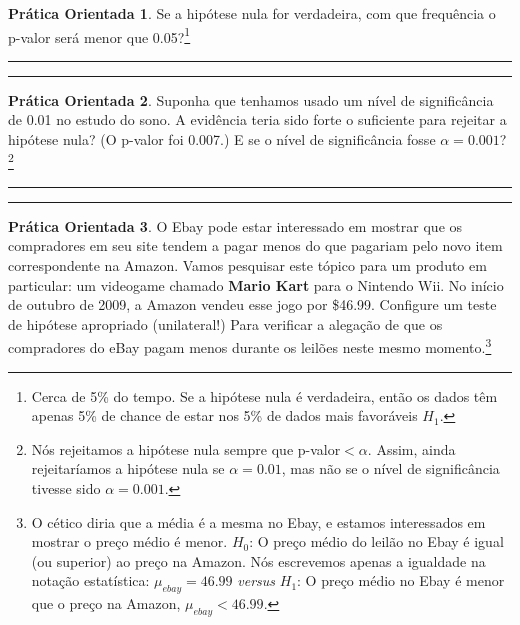 \documentclass[
]{book}
\theoremstyle{definition}
\theoremstyle{definition}
\theoremstyle{definition}
\newtheorem{exercise}{Prática Orientada}[chapter]
\theoremstyle{definition}
\theoremstyle{remark}
\begin{document}
\begin{exercise}
\protect\hypertarget{exr:unnamed-chunk-165}{}{\label{exr:unnamed-chunk-165} }Se a hipótese nula for verdadeira, com que frequência o p-valor será menor que 0.05?\footnote{Cerca de 5\% do tempo. Se a hipótese nula é verdadeira, então os dados têm apenas 5\% de chance de estar nos 5\% de dados mais favoráveis \(H_1\).}
\end{exercise}

\begin{center}\rule{0.5\linewidth}{0.5pt}\end{center}

\begin{center}\rule{0.5\linewidth}{0.5pt}\end{center}

\begin{exercise}
\protect\hypertarget{exr:unnamed-chunk-166}{}{\label{exr:unnamed-chunk-166} }Suponha que tenhamos usado um nível de significância de 0.01 no estudo do sono. A evidência teria sido forte o suficiente para rejeitar a hipótese nula? (O p-valor foi 0.007.) E se o nível de significância fosse \(\alpha = 0.001\)?\footnote{Nós rejeitamos a hipótese nula sempre que p-valor\(< \alpha\). Assim, ainda rejeitaríamos a hipótese nula se \(\alpha = 0.01\), mas não se o nível de significância tivesse sido \(\alpha = 0.001\).}
\end{exercise}

\begin{center}\rule{0.5\linewidth}{0.5pt}\end{center}

\begin{center}\rule{0.5\linewidth}{0.5pt}\end{center}

\begin{exercise}
\protect\hypertarget{exr:unnamed-chunk-167}{}{\label{exr:unnamed-chunk-167} }O Ebay pode estar interessado em mostrar que os compradores em seu site tendem a pagar menos do que pagariam pelo novo item correspondente na Amazon. Vamos pesquisar este tópico para um produto em particular: um videogame chamado \textbf{Mario Kart} para o Nintendo Wii. No início de outubro de 2009, a Amazon vendeu esse jogo por \$46.99. Configure um teste de hipótese apropriado (unilateral!) Para verificar a alegação de que os compradores do eBay pagam menos durante os leilões neste mesmo momento.\footnote{O cético diria que a média é a mesma no Ebay, e estamos interessados em mostrar o preço médio é menor. \(H_0\): O preço médio do leilão no Ebay é igual (ou superior) ao preço na Amazon. Nós escrevemos apenas a igualdade na notação estatística: \(\mu_{ebay} = 46.99\) \emph{versus} \(H_1\): O preço médio no Ebay é menor que o preço na Amazon, \(\mu_{ebay} < 46.99\).}
\end{exercise}
\end{document}
